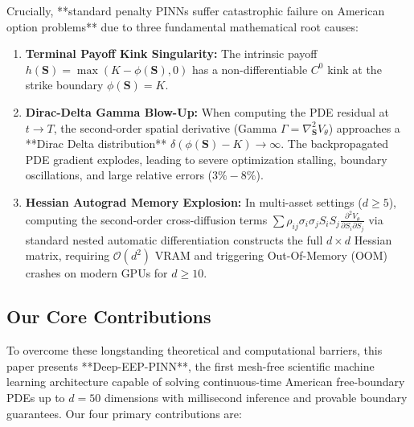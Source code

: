 \documentclass[11pt,a4paper]{article}
\begin{document}
Crucially, **standard penalty PINNs suffer catastrophic failure on American option problems** due to three fundamental mathematical root causes:
\begin{enumerate}[label=\textbf{Root Cause \arabic*:}, leftmargin=2.5em]
    \item \textbf{Terminal Payoff Kink Singularity:} The intrinsic payoff $h(\mathbf{S}) = \max(K - \phi(\mathbf{S}), 0)$ has a non-differentiable $C^0$ kink at the strike boundary $\phi(\mathbf{S}) = K$.
    \item \textbf{Dirac-Delta Gamma Blow-Up:} When computing the PDE residual at $t \to T$, the second-order spatial derivative (Gamma $\Gamma = \nabla^2_{\mathbf{S}} V_\theta$) approaches a **Dirac Delta distribution** $\delta(\phi(\mathbf{S}) - K) \to \infty$. The backpropagated PDE gradient explodes, leading to severe optimization stalling, boundary oscillations, and large relative errors ($3\% - 8\%$).
    \item \textbf{Hessian Autograd Memory Explosion:} In multi-asset settings ($d \ge 5$), computing the second-order cross-diffusion terms $\sum \rho_{ij} \sigma_i \sigma_j S_i S_j \frac{\partial^2 V_\theta}{\partial S_i \partial S_j}$ via standard nested automatic differentiation constructs the full $d \times d$ Hessian matrix, requiring $\mathcal{O}(d^2)$ VRAM and triggering Out-Of-Memory (OOM) crashes on modern GPUs for $d \ge 10$.
\end{enumerate}

\subsection{Our Core Contributions}
To overcome these longstanding theoretical and computational barriers, this paper presents **Deep-EEP-PINN**, the first mesh-free scientific machine learning architecture capable of solving continuous-time American free-boundary PDEs up to $d=50$ dimensions with millisecond inference and provable boundary guarantees. Our four primary contributions are:
\end{document}
